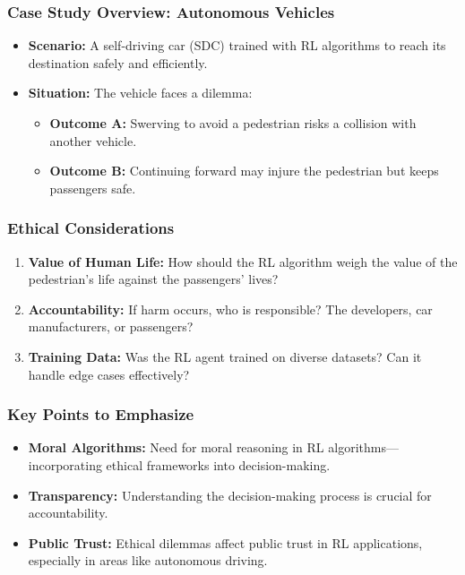 \documentclass{beamer}
\begin{document}
\begin{frame}
    \frametitle{Case Study Overview: Autonomous Vehicles}
    \begin{itemize}
        \item \textbf{Scenario:} A self-driving car (SDC) trained with RL algorithms to reach its destination safely and efficiently.
        \item \textbf{Situation:} The vehicle faces a dilemma:
            \begin{itemize}
                \item \textbf{Outcome A:} Swerving to avoid a pedestrian risks a collision with another vehicle.
                \item \textbf{Outcome B:} Continuing forward may injure the pedestrian but keeps passengers safe.
            \end{itemize}
    \end{itemize}
\end{frame}

\begin{frame}
    \frametitle{Ethical Considerations}
    \begin{enumerate}
        \item \textbf{Value of Human Life:} How should the RL algorithm weigh the value of the pedestrian's life against the passengers' lives?
        \item \textbf{Accountability:} If harm occurs, who is responsible? The developers, car manufacturers, or passengers?
        \item \textbf{Training Data:} Was the RL agent trained on diverse datasets? Can it handle edge cases effectively?
    \end{enumerate}
\end{frame}

\begin{frame}[fragile]
    \frametitle{Key Points to Emphasize}
    \begin{itemize}
        \item \textbf{Moral Algorithms:} Need for moral reasoning in RL algorithms—incorporating ethical frameworks into decision-making.
        \item \textbf{Transparency:} Understanding the decision-making process is crucial for accountability.
        \item \textbf{Public Trust:} Ethical dilemmas affect public trust in RL applications, especially in areas like autonomous driving.
    \end{itemize}
\end{frame}
\end{document}
